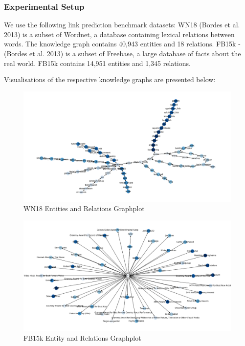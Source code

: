 \subsubsection{Experimental Setup} 

We use the following link prediction benchmark datasets: WN18 (Bordes et al. 2013) is a subset of Wordnet, a database containing lexical relations between words. The knowledge graph contains 40,943 entities and 18 relations. FB15k - (Bordes et al. 2013) is a subset of Freebase, a large database of facts about the real world. FB15k contains 14,951 entities and 1,345 relations. \bigskip

Visualisations of the respective knowledge graphs are presented below:

\begin{figure}[H]
  	\caption{WN18 Entities and Relations Graphplot}
   	\centering
    	\includegraphics[width=\textwidth]{WN18_Graph}
\end{figure}

\begin{figure}[H]
  	\caption{FB15k Entity and Relations Graphplot}
   	\centering
    	\includegraphics[width=\textwidth]{FB15k_Graph}
\end{figure}

